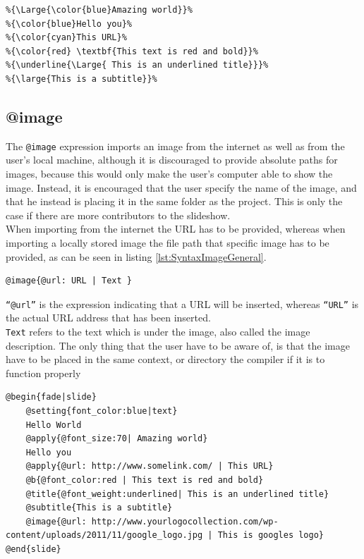 {\begin{lstlisting}[frame=single, caption=Hello World with subtitle, label=lst:SyntaxSubtitle]
%Output: {\color{blue}Hello World}%
%{\Large{\color{blue}Amazing world}}%
%{\color{blue}Hello you}%
%{\color{cyan}This URL}%
%{\color{red} \textbf{This text is red and bold}}%
%{\underline{\Large{ This is an underlined title}}}%
%{\large{This is a subtitle}}%
\end{lstlisting}

\subsection{@image}
The \texttt{@image} expression imports an image from the internet as well as from the user's local machine, although it is discouraged to provide absolute paths for images, because this would only make the user's computer able to show the image. Instead, it is encouraged that the user specify the name of the image, and that he instead is placing it in the same folder as the project. This is only the case if there are more contributors to the slideshow.\\
When importing from the internet the URL has to be provided, whereas when importing a locally stored image the file path that specific image has to be provided, as can be seen in listing \ref{lst:SyntaxImageGeneral}.

\begin{lstlisting}[frame=single, caption=Image expression generic, label=lst:SyntaxImageGeneral]
@image{@url: URL | Text }
\end{lstlisting}

\texttt{``@url''} is the expression indicating that a URL will be inserted, whereas \texttt{``URL''} is the actual URL address that has been inserted. \\
\texttt{Text} refers to the text which is under the image, also called the image description.
The only thing that the user have to be aware of, is that the image have to be placed in the same context, or directory the compiler if it is to function properly

\begin{lstlisting}[frame=single, caption=Hello World with an image, label=lst:SyntaxImage]
@begin{fade|slide}
    @setting{font_color:blue|text}
    Hello World
    @apply{@font_size:70| Amazing world}
    Hello you
    @apply{@url: http://www.somelink.com/ | This URL}
    @b{@font_color:red | This text is red and bold}
    @title{@font_weight:underlined| This is an underlined title}
    @subtitle{This is a subtitle}
    @image{@url: http://www.yourlogocollection.com/wp-content/uploads/2011/11/google_logo.jpg | This is googles logo}
@end{slide}


\end{lstlisting}}
